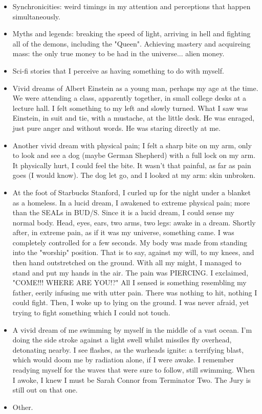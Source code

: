 \documentclass{article}
\begin{document}
\begin{itemize}
\item Synchronicities: weird timings in my attention and perceptions that happen simultaneously.

\item Myths and legends: breaking the speed of light, arriving in hell and fighting all of the demons, including the "Queen". Achieving mastery and acquireing mass: the only true money to be had in the universe... alien money. 

\item Sci-fi stories that I perceive as having something to do with myself.

\item Vivid dreams of Albert Einstein as a young man, perhaps my age at the time. We were attending a class, apparently together, in small college desks at a lecture hall. I felt something to my left and slowly turned. What I saw was Einstein, in suit and tie, with a mustache, at the little desk. He was enraged, just pure anger and without words. He was staring directly at me.

\item Another vivid dream with physical pain; I felt a sharp bite on my arm, only to look and see a dog (maybe German Shepherd) with a full lock on my arm. It physically hurt, I could feel the bite. It wasn't that painful, as far as pain goes (I would know). The dog let go, and I looked at my arm: skin unbroken.

\item At the foot of Starbucks Stanford, I curled up for the night under a blanket as a homeless. In a lucid dream, I awakened to extreme physical pain; more than the SEALs in BUD/S. Since it is a lucid dream, I could sense my normal body. Head, eyes, ears, two arms, two legs: awake in a dream. Shortly after, in extreme pain, as if it was my universe, something came. I was completely controlled for a few seconds. My body was made from standing into the "worship" position. That is to say, against my will, to my knees, and then hand outstretched on the ground. With all my might, I managed to stand and put my hands in the air. The pain was PIERCING. I exclaimed, "COME!!! WHERE ARE YOU!?" All I sensed is something resembling my father, eerily infusing me with utter pain. There was nothing to hit, nothing I could fight. Then, I woke up to lying on the ground. I was never afraid, yet trying to fight something which I could not touch.

\item A vivid dream of me swimming by myself in the middle of a vast ocean. I'm doing the side stroke against a light swell whilst missiles fly overhead, detonating nearby. I see flashes, as the warheads ignite: a terrifying blast, which would doom me by radiation alone, if I were awake. I remember readying myself for the waves that were sure to follow, still swimming. When I awoke, I knew I must be Sarah Connor from Terminator Two. The Jury is still out on that one.


\item Other.

\end{itemize}
\end{document}
